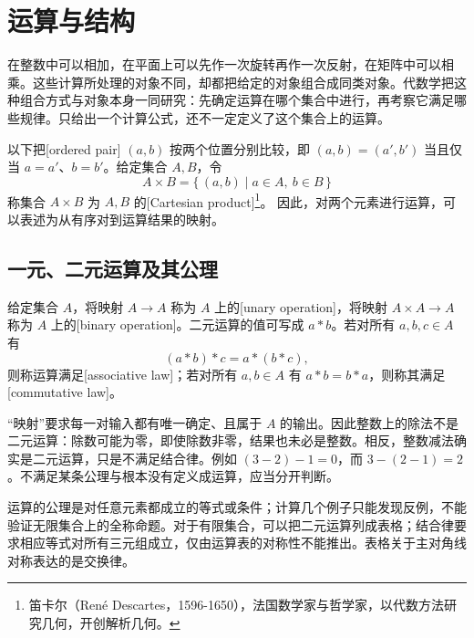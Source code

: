 
\section{运算与结构}
\label{b1:sec:0101}

%
%

在整数中可以相加，在平面上可以先作一次旋转再作一次反射，在矩阵中可以相乘。这些计算所处理的对象不同，却都把给定的对象组合成同类对象。代数学把这种组合方式与对象本身一同研究：先确定运算在哪个集合中进行，再考察它满足哪些规律。只给出一个计算公式，还不一定定义了这个集合上的运算。

\ProseParagraphBreak
以下把[ordered pair] \((a,b)\) 按两个位置分别比较，即 \((a,b)=(a',b')\) 当且仅当 \(a=a'\)、\(b=b'\)。给定集合 \(A,B\)，令
\[
	A\times B=\bigl\{\,(a,b)\mid a\in A,\ b\in B\,\bigr\}
\]
称集合 \(A\times B\) 为 \(A,B\) 的[Cartesian product]\footnote{笛卡尔（René Descartes，1596-1650），法国数学家与哲学家，以代数方法研究几何，开创解析几何。}。 因此，对两个元素进行运算，可以表述为从有序对到运算结果的映射。

\subsection{一元、二元运算及其公理}
\label{b1:subsec:0101:01}

\begin{definition}\label{b1:def:operation}
	给定集合 \(A\)，将映射 \(A\rightarrow A\) 称为 \(A\) 上的[unary operation]，将映射 \(A\times A\rightarrow A\) 称为 \(A\) 上的[binary operation]。二元运算的值可写成 \(a*b\)。若对所有 \(a,b,c\in A\) 有
	\[
		(a*b)*c=a*(b*c),
	\]
	则称运算满足[associative law]；若对所有 \(a,b\in A\) 有 \(a*b=b*a\)，则称其满足[commutative law]。
\end{definition}

“映射”要求每一对输入都有唯一确定、且属于 \(A\) 的输出。因此整数上的除法不是二元运算：除数可能为零，即使除数非零，结果也未必是整数。相反，整数减法确实是二元运算，只是不满足结合律。例如 \((3-2)-1=0\)，而 \(3-(2-1)=2\)。不满足某条公理与根本没有定义成运算，应当分开判断。

\ProseParagraphBreak
运算的公理是对任意元素都成立的等式或条件；计算几个例子只能发现反例，不能验证无限集合上的全称命题。对于有限集合，可以把二元运算列成表格；结合律要求相应等式对所有三元组成立，仅由运算表的对称性不能推出。表格关于主对角线对称表达的是交换律。

